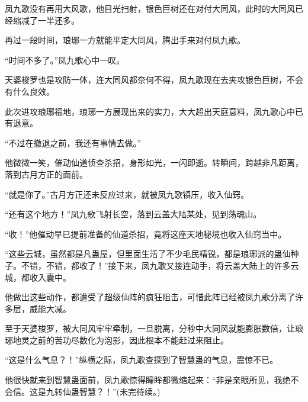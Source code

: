 \begin{this_body}
凤九歌没有再用大风歌，他目光扫射，银色巨树还在对付大同风，此时的大同风已经缩减了一半还多。

再过一段时间，琅琊一方就能平定大同风，腾出手来对付凤九歌。

“时间不多了。”凤九歌心中一叹。

天婆梭罗也是攻防一体，连大同风都奈何不得，凤九歌现在去夹攻银色巨树，不会有什么良效。

此次进攻琅琊福地，琅琊一方展现出来的实力，大大超出天庭意料，凤九歌心中已有退意。

“不过在撤退之前，我还有事情去做。”

他微微一笑，催动仙道侦查杀招，身形如光，一闪即逝。转瞬间，跨越非凡距离，落到古月方正的面前。

“就是你了。”古月方正还未反应过来，就被凤九歌镇压，收入仙窍。

“还有这个地方！”凤九歌飞射长空，落到云盖大陆某处，见到荡魂山。

“收！”他催动早已提前准备的仙道杀招，竟将这座天地秘境也收入仙窍当中。

“这些云城，虽然都是凡蛊屋，但里面生活了不少毛民精锐，都是琅琊派的蛊仙种子。不错，不错，都收了！”接下来，凤九歌又接连动手，将云盖大陆上的许多云城，都收入囊中。

他做出这些动作，都遭受了超级仙阵的疯狂阻击，可惜此阵已经被凤九歌分离了许多层，威能大减。

至于天婆梭罗，被大同风牢牢牵制，一旦脱离，分秒中大同风就能膨胀数倍，让琅琊地灵之前的苦功尽数化为泡影，因此根本不能赶过来阻止。

“这是什么气息？！”纵横之际，凤九歌查探到了智慧蛊的气息，震惊不已。

他很快就来到智慧蛊面前，凤九歌惊得瞳眸都微缩起来：“非是亲眼所见，我绝不会信。这是九转仙蛊智慧？！”(未完待续。)

\end{this_body}

